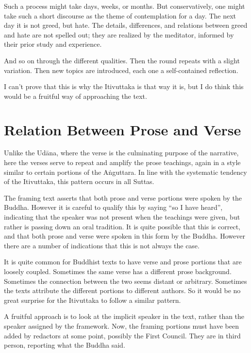 \documentclass[12pt,openany]{book}%
\begin{document}
Such a process might take days, weeks, or months. But conservatively, one might take such a short discourse as the theme of contemplation for a day. The next day it is not greed, but hate. The details, differences, and relations between greed and hate are not spelled out; they are realized by the meditator, informed by their prior study and experience.

And so on through the different qualities. Then the round repeats with a slight variation. Then new topics are introduced, each one a self-contained reflection.

I can’t prove that this is why the Itivuttaka is that way it is, but I do think this would be a fruitful way of approaching the text.

\section*{Relation Between Prose and Verse}

Unlike the \textsanskrit{Udāna}, where the verse is the culminating purpose of the narrative, here the verses serve to repeat and amplify the prose teachings, again in a style similar to certain portions of the \textsanskrit{Aṅguttara}. In line with the systematic tendency of the Itivuttaka, this pattern occurs in all Suttas.

The framing text asserts that both prose and verse portions were spoken by the Buddha. However it is careful to qualify this by saying “so I have heard”, indicating that the speaker was not present when the teachings were given, but rather is passing down an oral tradition. It is quite possible that this is correct, and that both prose and verse were spoken in this form by the Buddha. However there are a number of indications that this is not always the case.

It is quite common for Buddhist texts to have verse and prose portions that are loosely coupled. Sometimes the same verse has a different prose background. Sometimes the connection between the two seems distant or arbitrary. Sometimes the texts attribute the different portions to different authors. So it would be no great surprise for the Itivuttaka to follow a similar pattern.

A fruitful approach is to look at the implicit speaker in the text, rather than the speaker assigned by the framework. Now, the framing portions must have been added by redactors at some point, possibly the First Council. They are in third person, reporting what the Buddha said.
\end{document}
